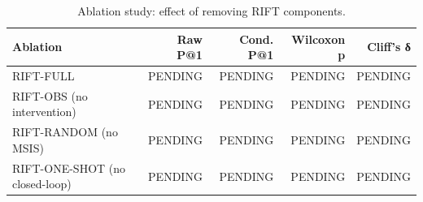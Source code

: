 \begin{table}[t]
  \centering
  \caption{Ablation study: effect of removing RIFT components.}
  \begin{tabular}{lrrrr}
    \hline
    Ablation & Raw P@1 & Cond. P@1 & Wilcoxon p & Cliff's δ \\
    \hline
    RIFT-FULL & PENDING & PENDING & PENDING & PENDING \\
    RIFT-OBS (no intervention) & PENDING & PENDING & PENDING & PENDING \\
    RIFT-RANDOM (no MSIS) & PENDING & PENDING & PENDING & PENDING \\
    RIFT-ONE-SHOT (no closed-loop) & PENDING & PENDING & PENDING & PENDING \\
    \hline
  \end{tabular}
\end{table}
